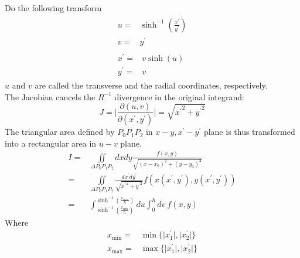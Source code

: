 \documentclass [10pt,letterpaper]{article}
\begin{document}
Do the following transform
\begin{subequations}  \label{eq:def-singular-near-singular-transform-u-v-xp-yp}
	\begin{align} 
		\begin{split}
		       u
		       =&
		       \sinh^{-1}
		       (
				\frac
				{x^{\prime}}
				{y^{\prime}}
		       )
		       \\
		       v
		       =&
		       y^{\prime}
		\end{split}
		\\
		\begin{split}
			x^{\prime}
			=& 
			v
			\sinh(u)
			\\
			y^{\prime}
			=&
			v
		\end{split}
	\end{align}
\end{subequations}
$u$ and $v$ are called the transverse and the radial coordinates, respectively.
\\
The Jacobian cancels the $R^{-1}$ divergence in the original integrand:
\begin{equation} \label{eq:result-singular-near-singular-jacobian-u-v-xp-yp}
	J
	=
	\bigg\lvert
		\frac
		{\partial(u,v)}
		{\partial(x^{\prime},y^{\prime})} 
	\bigg\rvert 
	=
	\sqrt{
		{x^{\prime}}^2
		+
		{y^{\prime}}^2
	}
\end{equation}
The triangular area defined by $P_0 P_1 P_2$ in $x-y,x^{\prime}-y^{\prime}$ plane is thus transformed into a rectangular area in $u-v$ plane.
\begin{equation} \label{eq:singular-near-singular-integral-result}
	\begin{split} 
		I
		=&
		\iint 
		\limits_{\Delta P_0 P_1 P_2}
		dx dy
		\frac{ f(x,y) }
		{ \sqrt{(x-x_0)^2+(y-y_0)^2} }
		\\
		=& 
		\iint 
		\limits_{\Delta P_0 P_1 P_2}
		\frac
		{  dx^{\prime} dy^{\prime}  }
		{ \sqrt{{x^{\prime}}^2+{y^{\prime}}^2} }
		f(x(x^{\prime},y^{\prime}),y(x^{\prime},y^{\prime}))
		\\
		=&
		\int 
		\nolimits
		_{\sinh^{-1}(\frac{x_{\min}}{h})}
		^{\sinh^{-1}(\frac{x_{\max}}{h})}
		du
		\int 
		\nolimits_{0}^{h} 
		dv
		\ f(x,y)
	\end{split}
\end{equation}
Where
\begin{equation} \label{eq:def-singular-near-singular-xmin-xmax}
	\begin{split} 
		x_{\min}
		=&
		\min
		\{
			\lvert x_1^{\prime} \rvert,
			\lvert x_2^{\prime} \rvert
		\}
		\\
		x_{\max}
		=&
		\max
		\{
			\lvert x_1^{\prime} \rvert,
			\lvert x_2^{\prime} \rvert
		\}
	\end{split} 
\end{equation}
\end{document}

